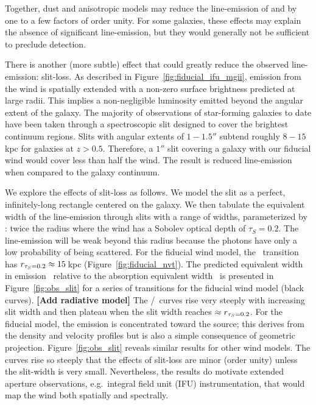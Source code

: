 \documentclass[12pt,preprint]{aastex}
\begin{document}
Together, dust and anisotropic models may reduce the line-emission
of  and 
by one to a few factors of order unity.  For some galaxies, these
effects may explain the absence of significant line-emission,
but they would generally
not be sufficient to preclude detection. 

There is another (more subtle) effect that could
greatly reduce the observed line-emission: slit-loss.  As
described in Figure~\ref{fig:fiducial_ifu_mgii}, 
emission from the wind is spatially extended with
a non-zero surface brightness predicted at large radii. This implies 
a non-negligible luminosity emitted beyond the angular extent of the galaxy.  
The majority of observations of star-forming galaxies to date have
been taken through a spectroscopic slit designed to cover
the brightest continuum regions. Slits with angular
extents of $1-1.5''$ subtend roughly $8-15$\,kpc for galaxies at $z>0.5$.
Therefore, a $1''$ slit covering a galaxy with our fiducial wind would cover
less than half the wind.  The result is reduced line-emission
when compared to the galaxy continuum.

We explore the effects of slit-loss as follows.
We model the slit as a perfect, infinitely-long rectangle centered on the
galaxy.  We then tabulate the equivalent width of the line-emission
through slits with a range of widths, parameterized by \rtt: twice the radius
where the wind has a Sobolev optical depth of $\tau_S = 0.2$. 
The line-emission will be weak beyond
this radius because the photons have only a low probability of
being scattered.  For the fiducial wind model, 
the \mgiia\ transition has $r_{\tau_S = 0.2} \approx 15$\,kpc 
(Figure~\ref{fig:fiducial_nvt}).  
The predicted equivalent width in emission \ewe\ relative to the absorption
equivalent width \ewabs\ is presented in
Figure~\ref{fig:obs_slit} for a series of transitions for the fiducial
wind model (black curves).
{\bf [Add radiative model]}
The \ewe/\ewabs\ curves rise very steeply with increasing slit width and then
plateau when the slit width reaches $\approx r_{\tau_S = 0.2}$.  
For the fiducial model, the emission is concentrated toward the source; this
derives from the density and velocity profiles but is also a simple
consequence of geometric projection.
Figure~\ref{fig:obs_slit} reveals similar results for other wind
models. The curves rise so steeply that 
the effects of slit-loss are minor (order unity)
unless the slit-width is very small.   
Nevertheless, the results do motivate
extended aperture observations, e.g.\ integral field unit (IFU)
instrumentation, that would map the wind both spatially and spectrally.
\end{document}
